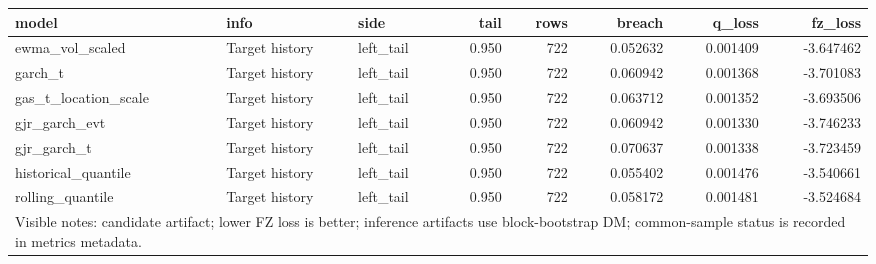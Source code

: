 \begin{tabular}{lllrrrrr}
\toprule
model & info & side & tail & rows & breach & q_loss & fz_loss \\
\midrule
ewma\_vol\_scaled & Target history & left\_tail & 0.950 & 722 & 0.052632 & 0.001409 & -3.647462 \\
garch\_t & Target history & left\_tail & 0.950 & 722 & 0.060942 & 0.001368 & -3.701083 \\
gas\_t\_location\_scale & Target history & left\_tail & 0.950 & 722 & 0.063712 & 0.001352 & -3.693506 \\
gjr\_garch\_evt & Target history & left\_tail & 0.950 & 722 & 0.060942 & 0.001330 & -3.746233 \\
gjr\_garch\_t & Target history & left\_tail & 0.950 & 722 & 0.070637 & 0.001338 & -3.723459 \\
historical\_quantile & Target history & left\_tail & 0.950 & 722 & 0.055402 & 0.001476 & -3.540661 \\
rolling\_quantile & Target history & left\_tail & 0.950 & 722 & 0.058172 & 0.001481 & -3.524684 \\
\midrule
\multicolumn{8}{l}{\footnotesize Visible notes: candidate artifact; lower FZ loss is better; inference artifacts use block-bootstrap DM; common-sample status is recorded in metrics metadata.} \\
\bottomrule
\end{tabular}
